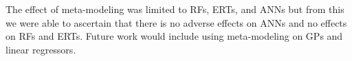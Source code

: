 \documentclass[a4paper, twoside, final, 12pt]{article}
\begin{document}
{The effect of meta-modeling was limited to RFs, ERTs, and ANNs but from this we were able to ascertain that there is no adverse effects on ANNs and no effects on RFs and ERTs. Future work would include using meta-modeling on GPs and linear regressors. 



}
\end{document}
